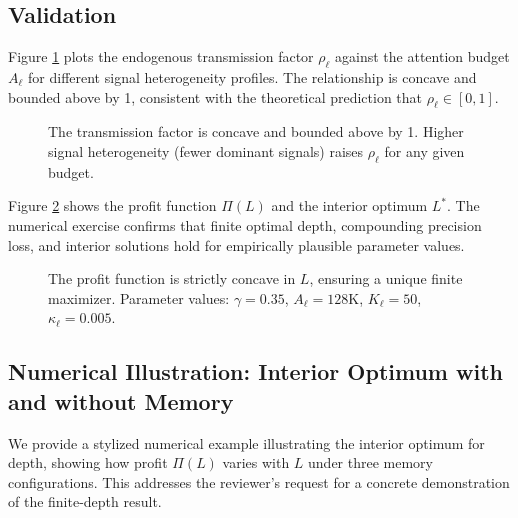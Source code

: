 \subsection{Validation}
\label{subsec:validation}

Figure \ref{fig:transmission_factor} plots the endogenous transmission factor $\rho_\ell$ against the attention budget $A_\ell$ for different signal heterogeneity profiles. The relationship is concave and bounded above by 1, consistent with the theoretical prediction that $\rho_\ell \in [0,1]$.

\begin{figure}[htbp]
\centering
{}
\caption{The transmission factor is concave and bounded above by 1. Higher signal heterogeneity (fewer dominant signals) raises $\rho_\ell$ for any given budget.}
\label{fig:transmission_factor}
\end{figure}

Figure \ref{fig:profit_function} shows the profit function $\Pi(L)$ and the interior optimum $L^*$. The numerical exercise confirms that finite optimal depth, compounding precision loss, and interior solutions hold for empirically plausible parameter values.

\begin{figure}[htbp]
\centering
{}
\caption{The profit function is strictly concave in $L$, ensuring a unique finite maximizer. Parameter values: $\gamma = 0.35$, $A_\ell = 128$K, $K_\ell = 50$, $\kappa_\ell = 0.005$.}
\label{fig:profit_function}
\end{figure}

\subsection{Numerical Illustration: Interior Optimum with and without Memory}
\label{subsec:interior_optimum}

We provide a stylized numerical example illustrating the interior optimum for depth, showing how profit $\Pi(L)$ varies with $L$ under three memory configurations. This addresses the reviewer's request for a concrete demonstration of the finite-depth result.

